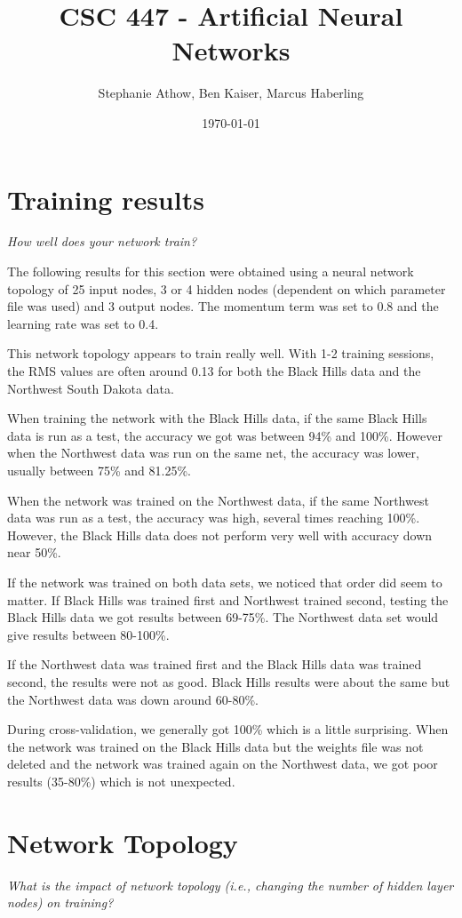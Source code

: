 \documentclass[•]{article}
\title{ CSC 447 - Artificial Neural Networks }
\author{Stephanie Athow, Ben Kaiser, Marcus Haberling}
\date{ \today }
\begin{document}
\maketitle

\section{Training results}
\textit{How well does your network train? }

The following results for this section were obtained using a neural network topology of 25 input nodes, 3 or 4 hidden nodes (dependent on which parameter file was used) and 3 output nodes. The momentum term was set to 0.8 and the learning rate was  set to 0.4. 

This network topology appears to train really well. With 1-2 training sessions, the RMS values are often around 0.13 for both the Black Hills data and the Northwest South Dakota data.

When training the network with the Black Hills data, if the same Black Hills data is run as a test, the accuracy we got was between 94\% and 100\%. However when the Northwest data was run on the same net, the accuracy was lower, usually between 75\% and 81.25\%.

When the network was trained on the Northwest data, if the same Northwest data was run as a test, the accuracy was high, several times reaching 100\%. However, the Black Hills data does not perform very well with accuracy down near 50\%.

If the network was trained on both data sets, we noticed that order did seem to matter. If Black Hills was trained first and Northwest trained second, testing the Black Hills data we got results between 69-75\%. The Northwest data set would give results between 80-100\%.

If the Northwest data was trained first and the Black Hills data was trained second, the results were not as good. Black Hills results were about the same but the Northwest data was down around 60-80\%.

During cross-validation, we generally got 100\% which is a little surprising. When the network was trained on the Black Hills data but the weights file was not deleted and the network was trained again on the Northwest data, we got poor results (35-80\%) which is not unexpected.


\section{Network Topology}
\textit{What is the impact of network topology (i.e., changing the number of hidden layer nodes) on training? }
\end{document}
